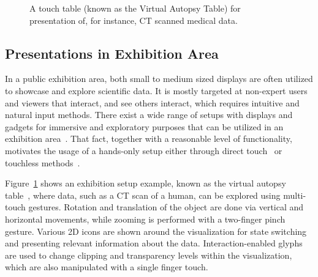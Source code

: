 \documentclass[review,journal]{vgtc}         %
\begin{document}
\begin{figure}[t]
	\centering
	\caption{A touch table (known as the Virtual Autopsy Table) for presentation of, for instance, CT scanned medical data.}
	\label{img:exhibition_table}
\end{figure}

\subsection{Presentations in Exhibition Area} \label{sec:exhibition}
In a public exhibition area, both small to medium sized displays are often utilized to showcase and explore scientific data.
It is mostly targeted at non-expert users and viewers that interact, and see others interact, which requires intuitive and natural input methods.
There exist a wide range of setups with displays and gadgets for immersive and exploratory purposes that can be utilized in an exhibition area~\cite{Laha:2013:VCB:2491367.2491368, conf/egve/KruszynskiL08}.
That fact, together with a reasonable level of functionality, motivates the usage of a hands-only setup either through direct touch~\cite{Klein:2012:DSD:2322389.2322403} or touchless methods~\cite{O'hara:2013:NTP:2442106.2442111}.

Figure~\ref{img:exhibition_table} shows an exhibition setup example, known as the virtual autopsy table~\cite{LRFPY11}, where data, such as a CT scan of a human, can be explored using multi-touch gestures.
Rotation and translation of the object are done via vertical and horizontal movements, while zooming is performed with a two-finger pinch gesture.
Various 2D icons are shown around the visualization for state switching and presenting relevant information about the data.
Interaction-enabled glyphs are used to change clipping and transparency levels within the visualization, which are also manipulated with a single finger touch.
\end{document}
